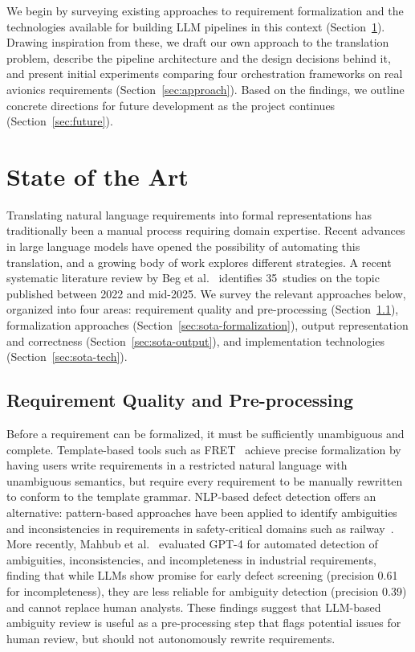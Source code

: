 We begin by surveying existing approaches to requirement formalization
and the technologies available for building LLM pipelines in this context
(Section~\ref{sec:sota}). Drawing inspiration from these, we draft our
own approach to the translation problem, describe the pipeline
architecture and the design decisions behind it, and present initial
experiments comparing four orchestration frameworks on real avionics
requirements (Section~\ref{sec:approach}). Based on the findings, we
outline concrete directions for future development as the project
continues (Section~\ref{sec:future}).


\section{State of the Art}
\label{sec:sota}

Translating natural language requirements into formal representations has
traditionally been a manual process requiring domain expertise. Recent
advances in large language models have opened the possibility of
automating this translation, and a growing body of work explores
different strategies. A recent systematic literature review by Beg
et al.~\cite{beg2025survey} identifies 35~studies on the topic published
between 2022 and mid-2025. We survey the relevant approaches below,
organized into four areas: requirement quality and pre-processing
(Section~\ref{sec:sota-quality}), formalization approaches
(Section~\ref{sec:sota-formalization}), output representation and
correctness (Section~\ref{sec:sota-output}), and implementation
technologies (Section~\ref{sec:sota-tech}).

\subsection{Requirement Quality and Pre-processing}
\label{sec:sota-quality}

Before a requirement can be formalized, it must be sufficiently
unambiguous and complete. Template-based tools such as
FRET~\cite{giannakopoulou2020fret} achieve precise formalization by
having users write requirements in a restricted natural language with
unambiguous semantics, but require every requirement to be manually
rewritten to conform to the template grammar. NLP-based defect detection
offers an alternative: pattern-based approaches have been applied to
identify ambiguities and inconsistencies in requirements in safety-critical
domains such as railway~\cite{ferrari2018detecting}. More recently, Mahbub
et al.~\cite{mahbub2024gpt4ambiguity} evaluated GPT-4 for automated
detection of ambiguities, inconsistencies, and incompleteness in
industrial requirements, finding that while LLMs show promise for early
defect screening (precision 0.61 for incompleteness), they are less
reliable for ambiguity detection (precision 0.39) and cannot replace
human analysts. These findings suggest that LLM-based ambiguity review is
useful as a pre-processing step that flags potential issues for human
review, but should not autonomously rewrite requirements.

